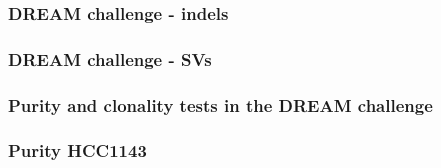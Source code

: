 \documentclass{beamer}
\begin{document}
\begin{frame}
\frametitle{DREAM challenge - indels}
\end{frame}

\begin{frame}
\frametitle{DREAM challenge - SVs}
\end{frame}

\begin{frame}
\frametitle{Purity and clonality tests in the DREAM challenge}
\end{frame}

\begin{frame}
\frametitle{Purity HCC1143}
\end{frame}
\end{document}
